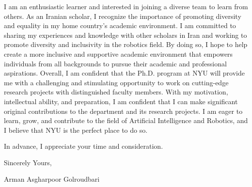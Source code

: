 \documentclass[a4,20pt]{article}
\begin{document}
\begin{large}
\vspace{-0.25cm} \quad I am an enthusiastic learner and interested in joining a diverse team to learn from others. As an Iranian scholar, I recognize the importance of promoting diversity and equality in my home country's academic environment. I am committed to sharing my experiences and knowledge with other scholars in Iran and working to promote diversity and inclusivity in the robotics field. By doing so, I hope to help create a more inclusive and supportive academic environment that empowers individuals from all backgrounds to pursue their academic and professional aspirations. Overall, I am confident that the Ph.D. program at NYU will provide me with a challenging and stimulating opportunity to work on cutting-edge research projects with distinguished faculty members. With my motivation, intellectual ability, and preparation, I am confident that I can make significant original contributions to the department and its research projects. I am eager to learn, grow, and contribute to the field of Artificial Intelligence and Robotics, and I believe that NYU is the perfect place to do so.\par

In advance, I appreciate your time and consideration. \par
\vspace{-0.4cm} Sincerely Yours, \par
\vspace{-0.4cm}Arman Asgharpoor Golroudbari \par


\end{large}
\end{document}
